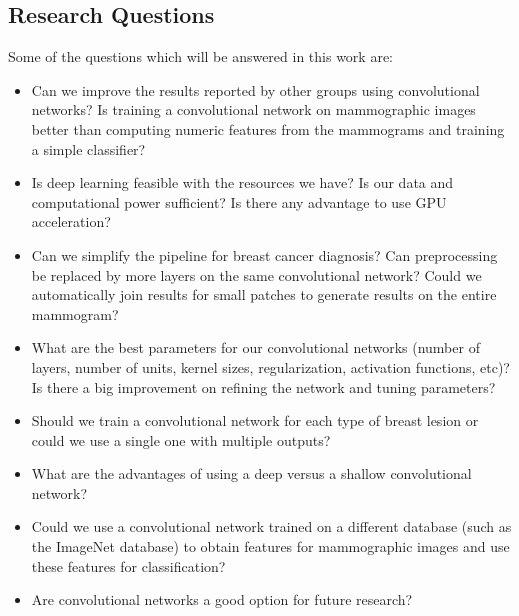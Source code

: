 \subsection{Research Questions}
Some of the questions which will be answered in this work are:
\begin{itemize} 
	\item Can we improve the results reported by other groups using convolutional networks? Is training a convolutional network on mammographic images better than computing numeric features from the mammograms and training a simple classifier?
	\item Is deep learning feasible with the resources we have? Is our data and computational power sufficient? Is there any advantage to use GPU acceleration?
	\item Can we simplify the pipeline for breast cancer diagnosis? Can preprocessing be replaced by more layers on the same convolutional network? Could we automatically join results for small patches to generate results on the entire mammogram?
	\item What are the best parameters for our convolutional networks (number of layers, number of units, kernel sizes, regularization, activation functions, etc)? Is there a big improvement on refining the network and tuning parameters?
	\item Should we train a convolutional network for each type of breast lesion or could we use a single one with multiple outputs?
	\item What are the advantages of using a deep versus a shallow convolutional network? 
	\item Could we use a convolutional network trained on a different database (such as the ImageNet database) to obtain features for mammographic images and use these features for classification?
	\item Are convolutional networks a good option for future research?
\end{itemize}

\begin{comment}
Las {\it Hipótesis}, que de acuerdo a Sampieri {\it indican lo que estamos
  buscando 
o tratando de probar y pueden definirse como explicaciones tentativas del
fenómeno investigado y formuladas a manera de proposiciones}. Las hipótesis
surgen normalmente de los {\it Objetivos} y proponen contestar tentativamente
  las preguntas de investigación.

{\bf Las preguntas de investigación se incluyen aquí ......}
\end{comment}
